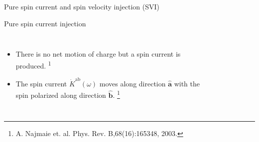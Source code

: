 \documentclass{beamer}
\begin{document}
\begin{frame}

\vspace{-0.2cm}

\noindent\makebox[\linewidth]{\rule{\linewidth}{0.4pt}}

\vspace{-2.0mm}
\begin{center}
{\large Pure spin current and spin velocity injection (SVI)}
\end{center}

\vspace{-6mm}
\noindent\makebox[\linewidth]{\rule{\linewidth}{0.4pt}}

\vspace{3mm}
{\Large Pure spin current injection}

\vspace{-4mm}
\begin{columns}


{\small


\begin{itemize}

\item 
There is no net motion of charge but a spin current is produced.
\textsuperscript{1}

\item 
The spin current $\dot{K}^{\mathrm{ab}}(\omega)$ moves along direction
$\mathbf{\hat{a}}$ with the spin polarized along direction $\mathbf{\hat{b}}$.
\footnote[frame]{\tiny A. Najmaie et. al. Phys. Rev. B,68(16):165348, 2003.}

\end{itemize}
}


\begin{figure}[h!]
\end{figure}
\end{columns}
\end{frame}
\end{document}
